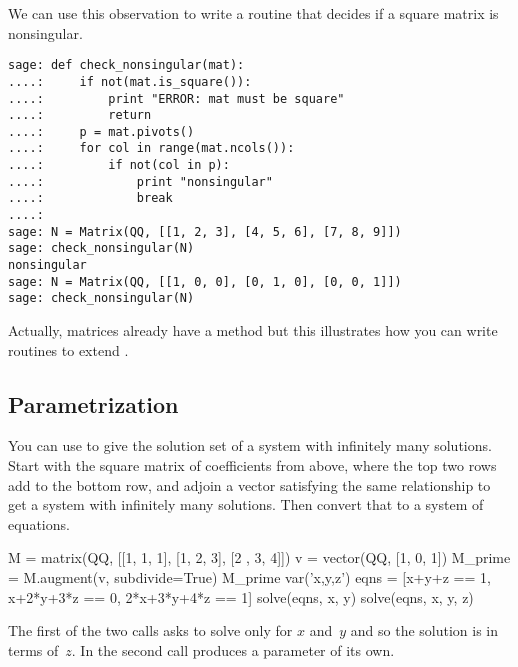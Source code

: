 We can use this observation to write a routine that decides if a 
square matrix is nonsingular.
         
\begin{lstlisting}
sage: def check_nonsingular(mat):
....:     if not(mat.is_square()):
....:         print "ERROR: mat must be square"
....:         return
....:     p = mat.pivots()
....:     for col in range(mat.ncols()):
....:         if not(col in p):
....:             print "nonsingular"
....:             break
....:          
sage: N = Matrix(QQ, [[1, 2, 3], [4, 5, 6], [7, 8, 9]])
sage: check_nonsingular(N)                                
nonsingular
sage: N = Matrix(QQ, [[1, 0, 0], [0, 1, 0], [0, 0, 1]])
sage: check_nonsingular(N)                                   
\end{lstlisting}
\noindent
Actually, \Sage{} matrices already have a method 
but this illustrates how you can write routines to extend \Sage.






\subsection{Parametrization}
You can use  to give the solution set of a system
with infinitely many solutions.
Start with the square matrix of coefficients from above,
where the top two rows add to the bottom row,
and adjoin a vector satisfying the same relationship to get
a system with infinitely many solutions.
Then convert that to a system of equations.
\begin{sageoutput}
M = matrix(QQ, [[1, 1, 1], [1, 2, 3], [2 , 3, 4]])    
v = vector(QQ, [1, 0, 1])                            
M_prime = M.augment(v, subdivide=True)               
M_prime
var('x,y,z')          
eqns = [x+y+z == 1, x+2*y+3*z == 0, 2*x+3*y+4*z == 1]
solve(eqns, x, y)   
solve(eqns, x, y, z)                                 
\end{sageoutput}
The first of the two  calls asks \Sage{} 
to solve only for $x$ and~$y$ and so the solution is in terms of~$z$.
In the second call \Sage{} produces a parameter of its own.   




